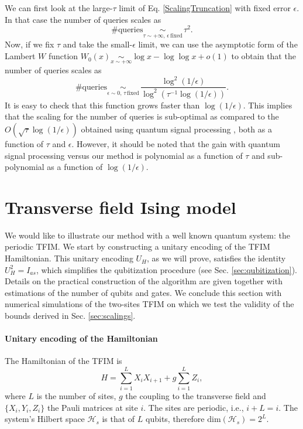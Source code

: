 \documentclass[a4paper,11pt]{article}
\begin{document}
We can first look at the large-$\tau$ limit of Eq. \eqref{ScalingTruncation} with fixed error $\epsilon$. In that case the number of queries scales as
\begin{equation}
    \#\mathrm{queries}\underset{\tau\sim +\infty, \, \epsilon \,\mathrm{fixed}}{\sim}\, \tau^2.
\end{equation}
Now, if we fix $\tau$ and take the small-$\epsilon$ limit, we can use the asymptotic form of the Lambert $W$ function $W_0(x)\underset{x\sim+\infty}{\sim}\log x-\log\log x+o(1)$ to obtain that the number of queries scales as 
\begin{equation}
    \#\mathrm{queries}\underset{\epsilon\sim 0, \, \tau \,\mathrm{fixed}}{\sim}\,\frac{\log^2(1/\epsilon)}{\log^2\left(\tau^{-1}\log(1/\epsilon)\right)}.
\end{equation}
It is easy to check that this function grows faster than $\log(1/\epsilon)$. This implies that the scaling for the number of queries is sub-optimal as compared to the $O(\sqrt{\tau}\log(1/\epsilon))$ obtained using quantum signal processing \cite{Gily_n_2019}, both as a function of $\tau$ and $\epsilon$. However, it should be noted that the gain with quantum signal processing versus our method is polynomial as a function of $\tau$ and sub-polynomial as a function of $\log(1/\epsilon)$.


\section{Transverse field Ising model}
\label{sec:TFIM}

We would like to illustrate our method with a well known quantum system: the periodic TFIM. We start by constructing a unitary encoding of the TFIM Hamiltonian. This unitary encoding $U_H$, as we will prove, satisfies the identity $U_H^2 = I_{as}$, which simplifies the qubitization procedure (see Sec. \ref{sec:qubitization}). Details on the practical construction of the algorithm are given together with estimations of the number of qubits and gates. We conclude this section with numerical simulations of the two-sites TFIM on which we test the validity of the bounds derived in Sec. \ref{sec:scalings}.

\paragraph{Unitary encoding of the Hamiltonian}

The Hamiltonian of the TFIM is 
\begin{equation}
    H= \sum_{i=1}^L X_iX_{i+1}+g\sum_{i=1}^LZ_i,
\end{equation}
where $L$ is the number of sites, $g$ the coupling to the transverse field and $\{X_i, Y_i, Z_i\}$ the Pauli matrices at site $i$. The sites are periodic, i.e., $i+L=i$. The system's Hilbert space $\mathcal{H}_s$ is that of $L$ qubits, therefore $\mathrm{dim}(\mathcal{H}_s)= 2^L$. 
\end{document}
